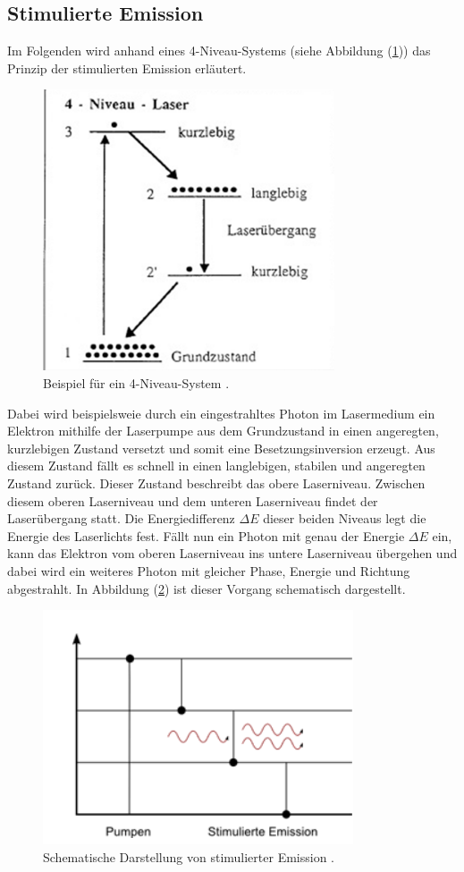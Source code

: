 \subsection{Stimulierte Emission}
Im Folgenden wird anhand eines 4-Niveau-Systems (siehe Abbildung (\ref{fig:4niv})) das Prinzip der stimulierten Emission erläutert.
\begin{figure}[h!]
  \centering
  \includegraphics[scale=0.7]{fig/niveau.png}
  \caption{Beispiel für ein 4-Niveau-System \cite[6]{Anleitung3}.}
  \label{fig:4niv}
\end{figure}
\FloatBarrier
\noindent Dabei wird beispielsweie durch ein eingestrahltes Photon im Lasermedium ein Elektron mithilfe der Laserpumpe aus dem Grundzustand in einen angeregten, kurzlebigen Zustand versetzt und somit eine Besetzungsinversion erzeugt. Aus diesem Zustand fällt es schnell in einen langlebigen, stabilen und angeregten Zustand zurück. Dieser Zustand beschreibt das obere Laserniveau. Zwischen diesem oberen Laserniveau und dem unteren Laserniveau findet der Laserübergang statt. Die Energiedifferenz $\Delta E$ dieser beiden Niveaus
legt die Energie des Laserlichts fest. Fällt nun ein Photon mit genau der Energie $\Delta E$ ein, kann das Elektron vom oberen Laserniveau ins untere Laserniveau übergehen und dabei wird ein weiteres Photon
mit gleicher Phase, Energie und Richtung abgestrahlt. In Abbildung (\ref{fig:stimu}) ist dieser Vorgang schematisch dargestellt.
\begin{figure}[h!]
  \centering
  \includegraphics[scale=0.7]{fig/stimu.png}
  \caption{Schematische Darstellung von stimulierter Emission \cite{Anleitung10}.}
  \label{fig:stimu}
\end{figure}
\FloatBarrier
